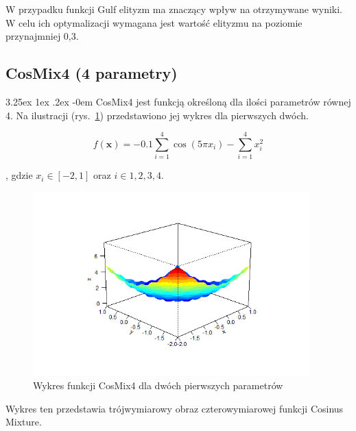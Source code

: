\documentclass[11pt, a4paper]{article}
\makeatletter
\newcommand{\fbi}{\leavevmode{\parindent=1em\indent}}
\renewcommand\paragraph{\@startsection{paragraph}{5}{\z@}
  {3.25ex \@plus1ex \@minus.2ex}
  {-0em}
  {\normalfont\normalsize\bfseries}}
\makeatother
\begin{document}
\fbi
W przypadku funkcji Gulf elityzm ma znaczący wpływ na otrzymywane wyniki. W celu ich optymalizacji wymagana jest wartość elityzmu na poziomie przynajmniej 0,3.

\newpage
\subsection{CosMix4 (4 parametry)}
\paragraph{}
CosMix4 jest funkcją określoną dla ilości parametrów równej 4. Na ilustracji (rys.~\ref{fig:cosmix41}) przedstawiono jej wykres dla pierwszych dwóch.

\begin{equation}\label{eq:cosmix4}
f(\boldsymbol{x}) = -0.1 \sum_{i=1}^{4} \cos (5 \pi x_i) - \sum_{i=1}^{4} x_i^2
\end{equation}

, gdzie $ x_i \in [-2, 1] $ oraz $ i \in {1,2,3,4} $.

\begin{figure}[H]
	\begin{center}
		\includegraphics[width=0.95\textwidth]{./assets/CosMix41.png}
		\caption{Wykres funkcji CosMix4 dla dwóch pierwszych parametrów}
		\label{fig:cosmix41}
	\end{center}
\end{figure}

\fbi
Wykres ten przedstawia trójwymiarowy obraz czterowymiarowej funkcji Cosinus Mixture. 
\end{document}
